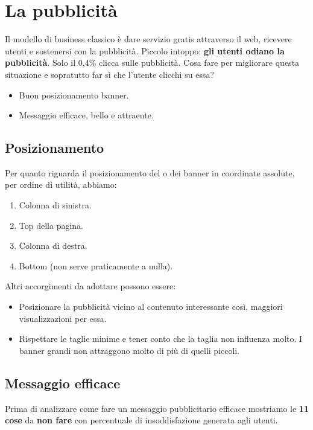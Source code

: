 
\chapter{La pubblicità}
	Il modello di business classico è dare servizio gratis attraverso il web, ricevere utenti e sostenersi con la pubblicità. Piccolo intoppo: \textbf{gli utenti odiano la pubblicità}. Solo il 0,4\% clicca sulle pubblicità. Cosa fare per migliorare questa situazione e sopratutto far sì che l'utente clicchi su essa?
	\begin{itemize}
		\item Buon posizionamento banner.
		\item Messaggio efficace, bello e attraente.
	\end{itemize}

	\section{Posizionamento}
		Per quanto riguarda il posizionamento del o dei banner in coordinate assolute, per ordine di utilità, abbiamo:
		\begin{enumerate}
			\item Colonna di sinistra.
			\item Top della pagina.
			\item Colonna di destra.
			\item Bottom (non serve praticamente a nulla).
		\end{enumerate}
		Altri accorgimenti da adottare possono essere:
		\begin{itemize}
			\item Posizionare la pubblicità vicino al contenuto interessante così, maggiori visualizzazioni per essa.
			\item Rispettare le taglie minime e tener conto che la taglia non influenza molto. I banner grandi non attraggono molto di più di quelli piccoli.
		\end{itemize}
	
	\section{Messaggio efficace}
		Prima di analizzare come fare un messaggio pubblicitario efficace mostriamo le \textbf{11 cose} da \textbf{non fare} con percentuale di insoddisfazione generata agli utenti.
		
